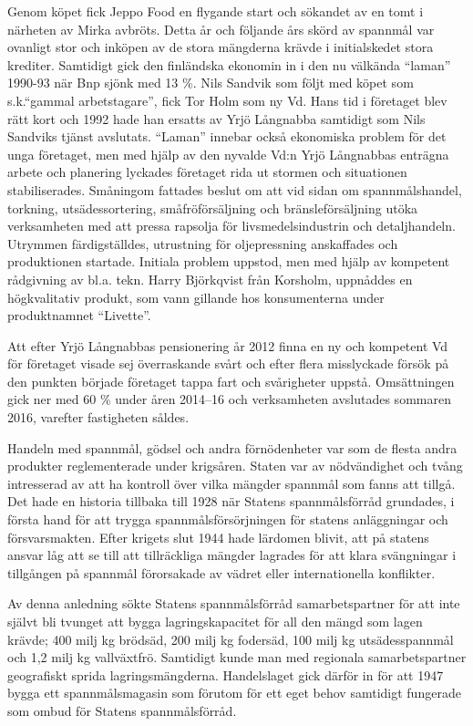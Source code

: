Genom köpet fick Jeppo Food en flygande start och sökandet av en tomt i närheten av Mirka avbröts. Detta år och följande års skörd av spannmål var ovanligt stor och inköpen av de stora mängderna krävde i initialskedet stora krediter. Samtidigt gick den finländska  ekonomin in i den nu välkända ``laman'' 1990-93 när Bnp sjönk med 13 \%.  Nils Sandvik som följt med köpet som s.k.``gammal arbetstagare'', fick Tor Holm som ny Vd. Hans tid i företaget blev rätt kort och 1992 hade han ersatts av Yrjö Långnabba samtidigt som Nils Sandviks tjänst avslutats. ``Laman'' innebar också ekonomiska problem för det unga företaget, men med hjälp av den nyvalde Vd:n Yrjö Långnabbas enträgna arbete och planering lyckades företaget rida ut stormen och situationen stabiliserades. Småningom fattades beslut om att vid sidan om spannmålshandel, torkning, utsädessortering, småfröförsäljning och bränsleförsäljning utöka verksamheten med att pressa rapsolja för livsmedelsindustrin och detaljhandeln. Utrymmen färdigställdes, utrustning för oljepressning anskaffades och produktionen startade. Initiala problem uppstod, men med hjälp av kompetent rådgivning av bl.a. tekn. Harry Björkqvist från Korsholm, uppnåddes en högkvalitativ produkt, som vann gillande hos konsumenterna under produktnamnet ``Livette''.

Att efter Yrjö Långnabbas pensionering år 2012 finna en ny och kompetent Vd för företaget visade sej överraskande svårt och efter flera misslyckade försök på den punkten började företaget tappa fart och svårigheter uppstå. Omsättningen gick ner med 60 \% under åren 2014--16 och verksamheten avslutades sommaren 2016, varefter fastigheten såldes.


Handeln med spannmål, gödsel och andra förnödenheter var som de flesta andra produkter reglementerade under krigsåren. Staten var av nödvändighet och tvång intresserad av att ha kontroll över vilka mängder spannmål som fanns att tillgå. Det hade en historia tillbaka till 1928 när Statens spannmålsförråd grundades, i första hand för att trygga spannmålsförsörjningen för statens anläggningar och försvarsmakten. Efter krigets slut 1944 hade lärdomen blivit, att på statens ansvar låg att se till att tillräckliga mängder lagrades för att klara svängningar i tillgången på spannmål förorsakade av vädret eller internationella konflikter.

Av denna anledning sökte Statens spannmålsförråd samarbetspartner för att inte självt bli tvunget att bygga lagringskapacitet för all den mängd som lagen krävde; 400 milj kg brödsäd, 200 milj kg fodersäd, 100 milj kg utsädesspannmål och 1,2 milj kg vallväxtfrö. Samtidigt kunde man med regionala samarbetspartner geografiskt sprida lagringsmängderna. Handelslaget gick därför in för att 1947 bygga ett spannmålsmagasin som förutom för ett eget behov samtidigt fungerade som ombud för Statens spannmålsförråd.


